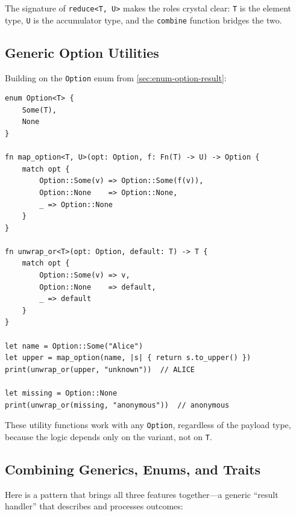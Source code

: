 The signature of \lstinline|reduce<T, U>| makes the roles crystal clear:
\lstinline|T| is the element type, \lstinline|U| is the accumulator type,
and the \lstinline|combine| function bridges the two.

\subsection{Generic Option Utilities}

Building on the \lstinline|Option| enum from \cref{sec:enum-option-result}:

\begin{lstlisting}[language=Lattice, caption={Generic Option helpers}]
enum Option<T> {
    Some(T),
    None
}

fn map_option<T, U>(opt: Option, f: Fn(T) -> U) -> Option {
    match opt {
        Option::Some(v) => Option::Some(f(v)),
        Option::None    => Option::None,
        _ => Option::None
    }
}

fn unwrap_or<T>(opt: Option, default: T) -> T {
    match opt {
        Option::Some(v) => v,
        Option::None    => default,
        _ => default
    }
}

let name = Option::Some("Alice")
let upper = map_option(name, |s| { return s.to_upper() })
print(unwrap_or(upper, "unknown"))  // ALICE

let missing = Option::None
print(unwrap_or(missing, "anonymous"))  // anonymous
\end{lstlisting}

These utility functions work with any \lstinline|Option|, regardless of
the payload type, because the logic depends only on the variant, not on
\lstinline|T|.

\subsection{Combining Generics, Enums, and Traits}

Here is a pattern that brings all three features together---a generic
``result handler'' that describes and processes outcomes:

